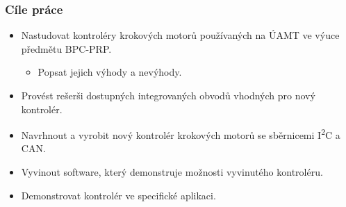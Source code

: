 \documentclass[%
  12pt,       				%
	t,                  %
	aspectratio=1610,   %
	unicode,						%
]{beamer}				    	%
\begin{document}
\disablenavigationsymbols

\maketitle

\begin{frame} 
	\frametitle{Cíle práce}
	\begin{itemize}
			\item Nastudovat kontroléry krokových motorů používaných na ÚAMT ve výuce předmětu BPC-PRP.
			\begin{itemize}
				\item Popsat jejich výhody a nevýhody.
			\end{itemize}
			\item Provést rešerši dostupných integrovaných obvodů vhodných pro nový kontrolér.
			\item Navrhnout a vyrobit nový kontrolér krokových motorů se sběrnicemi I\textsuperscript{2}C a CAN.
			\item Vyvinout software, který demonstruje možnosti vyvinutého kontroléru.
			\item Demonstrovat kontrolér ve specifické aplikaci.
	\end{itemize}
\end{frame}
\end{document}

